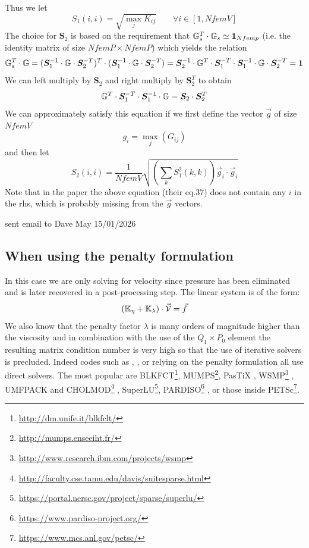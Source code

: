 Thus we let 
\[
S_1(i,i) = \sqrt{ \max_j K_{ij}} \qquad \forall i \in [1,NfemV]
\]
The choice for ${\bm S}_2$ is based on the requirement that ${\mathbb{G}}^T_s\cdot {\mathbb{G}}_s \simeq {\bm 1}_{Nfemp}$ (i.e.
the identity matrix of size $NfemP\times NfemP$) which yields the relation
\[
{\mathbb{G}}^T_s \cdot {\mathbb{G}} = ({\bm S}_1^{-1} \cdot {\mathbb{G}} \cdot {\bm S}_2^{-T})^T 
\cdot ({\bm S}_1^{-1} \cdot {\mathbb{G}} \cdot {\bm S}_2^{-T} )
= {\bm S}_2^{-1} \cdot {\mathbb{G}}^T \cdot {\bm S}_1^{-T} \cdot {\bm S}_1^{-1} \cdot {\mathbb{G}} \cdot {\bm S}_2^{-T} = {\bm 1}
\]
We can left multiply by ${\bm S}_2$ and right multiply by  ${\bm S}_2^T$ to obtain
\[
{\mathbb{G}}^T \cdot {\bm S}_1^{-T} \cdot {\bm S}_1^{-1} \cdot {\mathbb{G}} = {\bm S}_2 \cdot {\bm S}_2^T
\]
We can approximately satisfy this equation if we first define the vector $\vec{g}$ of size $NfemV$
\[
g_i = \max_j(G_{ij}) 
\]
and then let
\[
S_2(i,i)=\frac{1}{NfemV} \sqrt{ \left( \sum_k S_1^2(k,k) \right)   \vec{g}_i \cdot \vec{g}_i}
\]
Note that in the paper the above equation (their eq.37) does not contain any $i$ in the rhs, 
which is probably missing from the $\vec{g}$ vectors.


{\color{red} sent email to Dave May 15/01/2026}



\subsection{When using the penalty formulation}

In this case we are only solving for velocity since pressure has been eliminated 
and is later recovered in a post-processing step. The linear system is of the form:
\[
({\mathbb{K}}_\eta+{\mathbb{K}}_\lambda) \cdot \vec {\cal V} = \vec f
\]
 We also know that 
the penalty factor $\lambda$ is many orders of magnitude higher than the viscosity and 
in combination with the use of the $Q_1 \times P_0$ element the resulting matrix 
condition number is very high so that the use of iterative solvers is precluded. 
Indeed codes such as \sopale \cite{full95}, \douar \cite{brtf08}, \fantom \cite{thie11} 
or \sulec \cite{qube11} relying on the penalty formulation all use direct solvers.
The most popular are BLKFCT\footnote{\url{http://dm.unife.it/blkfclt/}}, 
MUMPS\footnote{\url{http://mumps.enseeiht.fr/}}\cite{amdu89,amdl00,amdk01,amgl06,ambl19}, 
PasTiX \cite{herr02},
WSMP\footnote{\url{http://www.research.ibm.com/projects/wsmp}} \cite{GUPTA94ieee,GUPTA09sc-long},
UMFPACK and CHOLMOD\footnote{\url{http://faculty.cse.tamu.edu/davis/suitesparse.html}}
, SuperLU\footnote{\url{https://portal.nersc.gov/project/sparse/superlu/}}, 
PARDISO\footnote{\url{https://www.pardiso-project.org/}}
\cite{pardiso-6.0a,pardiso-6.0b,pardiso-6.0c}, or those inside 
PETSc\footnote{\url{https://www.mcs.anl.gov/petsc/}}.

